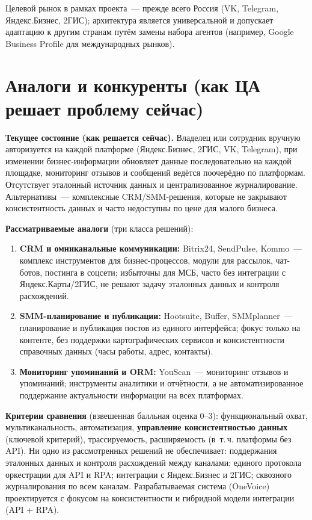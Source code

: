 \documentclass[12pt]{G7-32}
\begin{document}
Целевой рынок в рамках проекта~--- прежде всего Россия (VK, Telegram, Яндекс.Бизнес, 2ГИС); архитектура является универсальной и допускает адаптацию к другим странам путём замены набора агентов (например, Google Business Profile для международных рынков).

\chapter{Аналоги и конкуренты (как ЦА решает проблему сейчас)}
\label{ch:analogues}

\textbf{Текущее состояние (как решается сейчас).} Владелец или сотрудник вручную авторизуется на каждой платформе (Яндекс.Бизнес, 2ГИС, VK, Telegram), при изменении бизнес-информации обновляет данные последовательно на каждой площадке, мониторинг отзывов и сообщений ведётся поочерёдно по платформам. Отсутствует эталонный источник данных и централизованное журналирование. Альтернативы~--- комплексные CRM/SMM-решения, которые не закрывают консистентность данных и часто недоступны по цене для малого бизнеса.

\textbf{Рассматриваемые аналоги} (три класса решений):

\begin{enumerate}
  \item \textbf{CRM и омниканальные коммуникации:} Bitrix24, SendPulse, Kommo~--- комплекс инструментов для бизнес-процессов, модули для рассылок, чат-ботов, постинга в соцсети; избыточны для МСБ, часто без интеграции с Яндекс.Карты/2ГИС, не решают задачу эталонных данных и контроля расхождений.
  \item \textbf{SMM-планирование и публикации:} Hootsuite, Buffer, SMMplanner~--- планирование и публикация постов из единого интерфейса; фокус только на контенте, без поддержки картографических сервисов и консистентности справочных данных (часы работы, адрес, контакты).
  \item \textbf{Мониторинг упоминаний и ORM:} YouScan~--- мониторинг отзывов и упоминаний; инструменты аналитики и отчётности, а не автоматизированное поддержание актуальности информации на всех платформах.
\end{enumerate}

\textbf{Критерии сравнения} (взвешенная балльная оценка 0--3): функциональный охват, мультиканальность, автоматизация, \textbf{управление консистентностью данных} (ключевой критерий), трассируемость, расширяемость (в~т.\,ч. платформы без API). Ни одно из рассмотренных решений не обеспечивает: поддержания эталонных данных и контроля расхождений между каналами; единого протокола оркестрации для API и RPA; интеграции с Яндекс.Бизнес и 2ГИС; сквозного журналирования по всем каналам. Разрабатываемая система (OneVoice) проектируется с фокусом на консистентности и гибридной модели интеграции (API + RPA).
\end{document}
